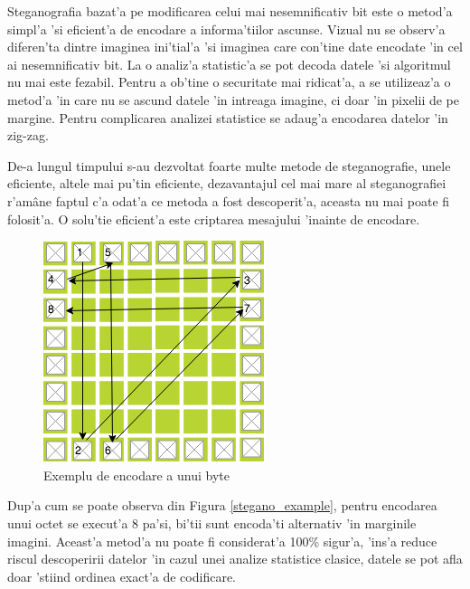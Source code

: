 \documentclass[12pt,a4paper,twoside]{report}
\begin{document}
Steganografia bazat'a pe modificarea celui mai nesemnificativ bit este o metod'a simpl'a 'si eficient'a de encodare a informa'tiilor ascunse. Vizual nu se observ'a diferen'ta dintre imaginea ini'tial'a 'si imaginea care con'tine date encodate 'in cel ai nesemnificativ bit. La o analiz'a statistic'a se pot decoda datele 'si algoritmul nu mai este fezabil. Pentru a ob'tine o securitate mai ridicat'a, a se utilizeaz'a o metod'a 'in care nu se ascund datele 'in intreaga imagine, ci doar 'in pixelii de pe margine. Pentru complicarea analizei statistice se adaug'a encodarea datelor 'in zig-zag.

De-a lungul timpului s-au dezvoltat foarte multe metode de steganografie, unele eficiente, altele mai pu'tin eficiente, dezavantajul cel mai mare al steganografiei r'amâne faptul c'a odat'a ce metoda a fost descoperit'a, aceasta nu mai poate fi folosit'a. O solu'tie eficient'a este criptarea mesajului 'inainte de encodare.

\begin{figure}[H]
\begin{center}
\advance\leftskip-3cm
\advance\rightskip-3cm
\includegraphics[keepaspectratio=true,scale=0.6]{img/stegano_example.png}
\caption{Exemplu de encodare a unui byte}
\label{stagano_example}
\end{center}
\end{figure} 

Dup'a cum se poate observa din Figura \ref{stegano_example}, pentru encodarea unui octet se execut'a 8 pa'si, bi'tii sunt encoda'ti alternativ 'in marginile imagini. Aceast'a metod'a nu poate fi considerat'a 100\% sigur'a, 'ins'a reduce riscul descoperirii datelor 'in cazul unei analize statistice clasice, datele se pot afla doar 'stiind ordinea exact'a de codificare.
\end{document}
